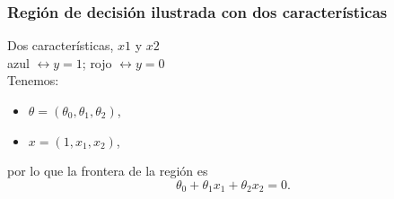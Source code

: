 \documentclass{beamer}
\begin{document}
 \begin{frame}\frametitle{Región de decisión ilustrada con dos características}
 \begin{minipage}[t][5cm][t]{5.5cm}
          \end{minipage}
       \begin{minipage}[t][5cm][t]{4.5cm}
         \footnotesize
     Dos características, $x1$ y $x2$\\
     azul $\leftrightarrow y=1$; rojo $\leftrightarrow y=0$\\
     Tenemos: 
     \begin{itemize}
     \item $\theta=(\theta_0,\theta_1,\theta_2)$,
     \item $x=(1,x_1,x_2)$,
     \end{itemize}
     por lo que la frontera de la región es $$\theta_0+\theta_1x_1+\theta_2x_2=0.$$ 
     \end{minipage}\\

 \end{frame}
\end{document}
